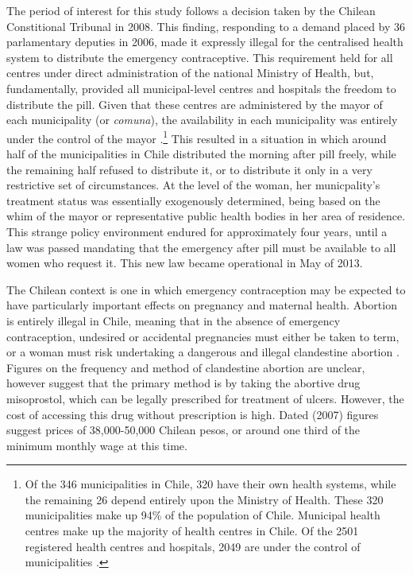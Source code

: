 The period of interest for this study follows a decision taken by the Chilean
Constitional Tribunal in 2008.  This finding, responding to a demand placed by
36 parlamentary deputies in 2006, made it expressly illegal for the centralised
health system to distribute the emergency contraceptive.  This requirement held
for all centres under direct administration of the national Ministry of Health,
but, fundamentally, provided all municipal-level centres and hospitals the 
freedom to distribute the pill.  Given that these centres are administered by 
the mayor of each municipality (or \emph{comuna}), the availability in each 
municipality was entirely under the control of the mayor \citep{Didesetal2011,
Didesetal2010,Didesetal2009}.\footnote{Of the 346 municipalities in Chile, 320
have their own health systems, while the remaining 26 depend entirely upon the
Ministry of Health.  These 320 municipalities make up 94\% of the population 
of Chile.  Municipal health centres make up the majority of health centres in 
Chile.  Of the 2501 registered health centres and hospitals, 2049 are under the
control of municipalities \citep{DEIS2013}.}  This resulted in a situation in
which around half of the municipalities in Chile distributed the morning after
pill freely, while the remaining half refused to distribute it, or to 
distribute it only in a very restrictive set of circumstances.  At the level
of the woman, her municpality's treatment status was essentially exogenously
determined, being based on the whim of the mayor or representative public 
health bodies in her area of residence.  This strange policy environment 
endured for approximately four years, until a law was passed mandating that the 
emergency after pill must be available to all women who request it.  This new 
law became operational in May of 2013.

The Chilean context is one in which emergency contraception may be expected to
have particularly important effects on pregnancy and maternal health.  Abortion
is entirely illegal in Chile, meaning that in the absence of emergency 
contraception, undesired or accidental pregnancies must either be taken to 
term, or a woman must risk undertaking a dangerous and illegal clandestine
abortion \citep{ShepardCasas2007}.  Figures on the frequency and method of 
clandestine abortion are unclear, however \citet{ShepardCasas2007} suggest that
the primary method is by taking the abortive drug misoprostol, which can be
legally prescribed for treatment of ulcers.  However, the cost of accessing 
this drug without prescription is high.  Dated (2007) figures suggest prices
of 38,000-50,000 Chilean pesos, or around one third of the minimum monthly wage
at this time.

